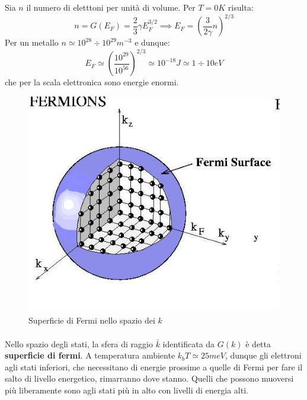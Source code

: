 \documentclass{book}
\begin{document}
            Sia $n$ il numero di eletttoni per unità di volume. Per $T=0K$ risulta:
            $$n = G(E_{F}) = \frac{2}{3} \gamma E_{F} ^{3/2} \implies E_{F} = (\frac{3}{2\gamma}n)^{2/3}$$
            Per un metallo $n \simeq 10^{28} \div 10^{29} m^{-3}$ e dunque:
            $$E_{F} \simeq (\frac{10^{29}}{10^{56}})^{2/3} \simeq 10^{-18}J \simeq 1 \div 10 eV$$
            che per la scala elettronica sono energie enormi.
            \begin{figure}[h!]
                \centering
                \includegraphics[width=0.5\linewidth]{img/FermiSurfaceLez12.png}
                \caption{Superficie di Fermi nello spazio dei $k$}
            \end{figure}

            \paragraph{}
                Nello spazio degli stati, la sfera di raggio $\bar{k}$ identificata da $G(k)$ è detta \textbf{superficie di fermi}. A temperatura ambiente $k_{b}T \simeq 25meV$, dunque gli elettroni agli stati inferiori, che necessitano di energie prossime a quelle di Fermi per fare il salto di livello energetico, rimarranno dove stanno. Quelli che possono muoversi più liberamente sono agli stati più in alto con livelli di energia alti.
\end{document}

